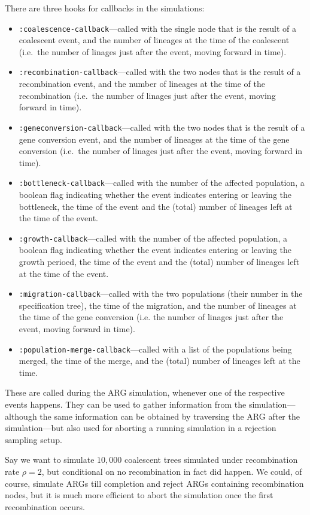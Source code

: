 \documentclass{manual}
\begin{document}
\begin{empfile}
There are three hooks for callbacks in the simulations:
\begin{itemize}
\item \texttt{:coalescence-callback}---called with the single node
  that is the result of a coalescent event, and the number of lineages
  at the time of the coalescent (i.e.\ the number of linages just after
  the event, moving forward in time).
\item \texttt{:recombination-callback}---called with the two nodes
  that is the result of a recombination event, and the number of
  lineages at the time of the recombination (i.e.\ the number of
  linages just after the event, moving forward in time).
\item \texttt{:geneconversion-callback}---called with the two nodes
  that is the result of a gene conversion event, and the number of
  lineages at the time of the gene conversion (i.e.\ the number of
  linages just after the event, moving forward in time).
\item \texttt{:bottleneck-callback}---called with the number of the
  affected population, a boolean flag indicating whether the event
  indicates entering or leaving the bottleneck, the time of the event
  and the (total) number of lineages left at the time of the event.
\item \texttt{:growth-callback}---called with the number of the
  affected population, a boolean flag indicating whether the event
  indicates entering or leaving the growth perioed, the time of the
  event and the (total) number of lineages left at the time of the
  event.
\item \texttt{:migration-callback}---called with the two populations
  (their number in the specification tree), the time of the migration,
  and the number of lineages at the time of the gene conversion
  (i.e. the number of linages just after the event, moving forward in
  time).
\item \texttt{:population-merge-callback}---called with a list of the
  populations being merged, the time of the merge, and the (total)
  number of lineages left at the time.
\end{itemize}
These are called during the ARG simulation, whenever one of the
respective events happens.  They can be used to gather information
from the simulation---although the same information can be obtained by
traversing the ARG after the simulation---but also used for aborting a
running simulation in a rejection sampling setup.

Say we want to simulate $10,000$ coalescent trees simulated under
recombination rate $\rho=2$, but conditional on no recombination in
fact did happen.  We could, of course, simulate ARGs till completion
and reject ARGs containing recombination nodes, but it is much more
efficient to abort the simulation once the first recombination occurs.


\end{empfile}
\end{document}
